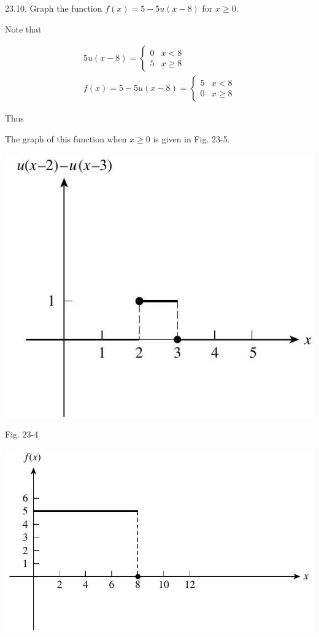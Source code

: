 \documentclass[10pt]{article}
\begin{document}
23.10. Graph the function $f(x)=5-5 u(x-8)$ for $x \geq 0$.

Note that

$$
\begin{gathered}
5 u(x-8)= \begin{cases}0 & x<8 \\
5 & x \geq 8\end{cases} \\
f(x)=5-5 u(x-8)= \begin{cases}5 & x<8 \\
0 & x \geq 8\end{cases}
\end{gathered}
$$

Thus

The graph of this function when $x \geq 0$ is given in Fig. 23-5.

\begin{center}
\includegraphics[max width=\textwidth]{2024_04_03_5bb5b4275a64cb9887d1g-255}
\end{center}

Fig. 23-4

\begin{center}
\includegraphics[max width=\textwidth]{2024_04_03_5bb5b4275a64cb9887d1g-255(1)}
\end{center}
\end{document}
